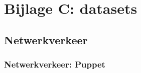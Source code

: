 


\chapter*{Bijlage C: datasets}



\section*{Netwerkverkeer}
\label{dataset:netwerkverkeer}
\subsection*{Netwerkverkeer: Puppet}
\label{dataset:netwerkverkeer:puppet}
